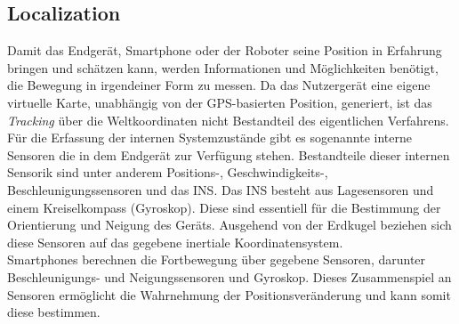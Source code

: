 \subsection{Localization}
Damit das Endgerät, Smartphone oder der Roboter seine Position in Erfahrung bringen und schätzen kann, werden Informationen und Möglichkeiten 
benötigt, die Bewegung in irgendeiner Form zu messen. Da das Nutzergerät eine eigene virtuelle Karte, unabhängig von der \acs{GPS}-basierten 
Position, generiert, ist das \textit{Tracking} über die Weltkoordinaten nicht Bestandteil des eigentlichen Verfahrens. Für die Erfassung der 
internen Systemzustände gibt es sogenannte interne Sensoren die in dem Endgerät zur Verfügung stehen. Bestandteile dieser internen 
Sensorik sind unter anderem Positions-, Geschwindigkeits-, Beschleunigungssensoren und das \acl{INS}. \cite{robotik2.2020m}
Das \acs{INS} besteht aus Lagesensoren und einem Kreiselkompass (Gyroskop). Diese sind essentiell für die Bestimmung 
der Orientierung und Neigung des Geräts. Ausgehend von der Erdkugel beziehen sich diese Sensoren auf das gegebene inertiale Koordinatensystem.
\\ 
Smartphones berechnen die Fortbewegung über gegebene Sensoren, darunter Beschleunigungs- und Neigungssensoren und Gyroskop. Dieses Zusammenspiel an 
Sensoren ermöglicht die Wahrnehmung der Positionsveränderung und kann somit diese bestimmen.
